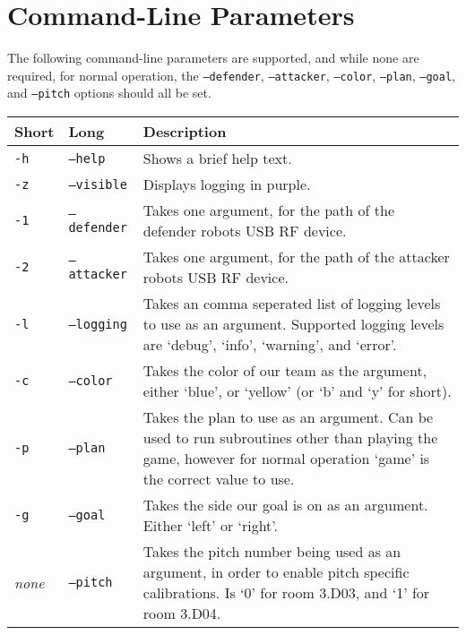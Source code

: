 \section{Command-Line Parameters} \label{params}

The following command-line parameters are supported, and while none are
required, for normal operation, the \texttt{--defender}, \texttt{--attacker},
\texttt{--color}, \texttt{--plan}, \texttt{--goal}, and \texttt{--pitch}
options should all be set.

\vspace{5mm}

\begin{tabularx}{\textwidth}{ll|X}
    Short       & Long & Description \\
    \hline
    \texttt{-h} & \texttt{--help}     & Shows a brief help text. \\
    \texttt{-z} & \texttt{--visible}  & Displays logging in purple. \\
    \texttt{-1} & \texttt{--defender} & Takes one argument, for the path of the
    defender robots USB RF device. \\
    \texttt{-2} & \texttt{--attacker} & Takes one argument, for the path of the
    attacker robots USB RF device. \\
    \texttt{-l} & \texttt{--logging}  & Takes an comma seperated list of
    logging levels to use as an argument. Supported logging levels are `debug',
    `info', `warning', and `error'. \\
    \texttt{-c} & \texttt{--color}    & Takes the color of our team as the
    argument, either `blue', or `yellow' (or `b' and `y' for short). \\
    \texttt{-p} & \texttt{--plan}     & Takes the plan to use as an argument.
    Can be used to run subroutines other than playing the game, however for
    normal operation `game' is the correct value to use. \\
    \texttt{-g} & \texttt{--goal}     & Takes the side our goal is on as an
    argument. Either `left' or `right'. \\
    \textit{none} & \texttt{--pitch}  & Takes the pitch number being used as an
    argument, in order to enable pitch specific calibrations. Is `0' for room
    3.D03, and `1' for room 3.D04. \\
\end{tabularx}
